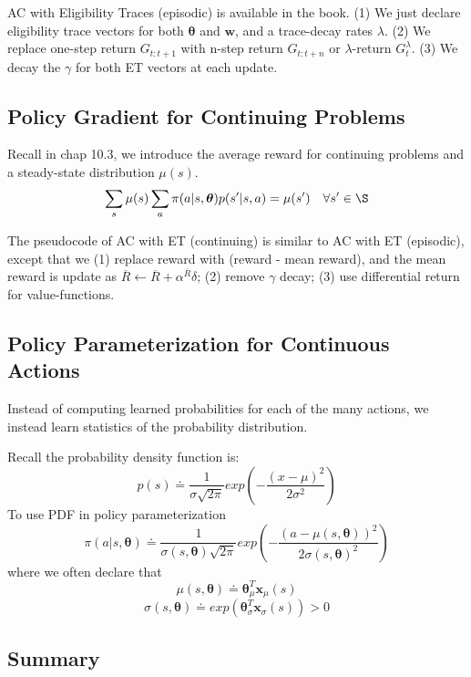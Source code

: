 \documentclass[sutton_barto_notes.tex]{subfiles}
\begin{document}
AC with Eligibility Traces (episodic) is available in the book. (1) We just declare eligibility trace vectors for both $\bm{\theta}$ and $\bm{w}$, and a trace-decay rates $\lambda$. (2) We replace one-step return $G_{t:t+1}$ with n-step return $G_{t:t+n}$ or $\lambda$-return $G_t^\lambda$. (3) We decay the $\gamma$ for both ET vectors at each update.

\subsection{Policy Gradient for Continuing Problems}

Recall in chap 10.3, we introduce the average reward for continuing problems and a steady-state distribution $\mu(s)$.
$$\sum_s \mu(s) \sum_a \pi(a|s,\bm{\theta}) p(s'|s,a) = \mu(s')\quad \forall s' \in \S$$

The pseudocode of AC with ET (continuing) is similar to AC with ET (episodic), except that we (1) replace reward with (reward - mean reward), and the mean reward is update as $\overline{R}\leftarrow\overline{R}+\alpha^{\overline{R}}\delta$; (2) remove $\gamma$ decay; (3) use differential return for value-functions.

\subsection{Policy Parameterization for Continuous Actions}

Instead of computing learned probabilities for each of the many actions, we instead learn statistics of the probability distribution.

Recall the probability density function is:
$$p(s)\doteq\frac{1}{\sigma\sqrt{2\pi}}exp(-\frac{(x-\mu)^2}{2\sigma^2})$$
To use PDF in policy parameterization
$$\pi(a|s,\bm{\theta}) \doteq\frac{1}{\sigma(s,\bm{\theta}) \sqrt{2\pi}}exp(-\frac{(a -\mu(s,\bm{\theta}))^2}{2\sigma(s,\bm{\theta})^2})$$
where we often declare that
$$\mu(s,\bm{\theta})\doteq \bm{\theta}_\mu^T \bm{x}_\mu (s)$$
$$\sigma(s,\bm{\theta}) \doteq exp(\bm{\theta}_\sigma^T \bm{x}_\sigma(s)) > 0$$

\subsection{Summary}
\end{document}
